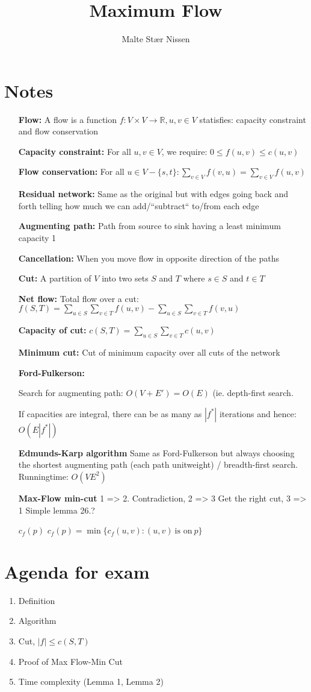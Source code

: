 \documentclass[11pt,a4paper]{article}
\title{Maximum Flow}
\author{Malte Stær Nissen}
\begin{document}
\maketitle

\section{Notes}
\begin{itemize}
    \item[\textbf{Flow:}]{ A flow is a function $f : V \times V \rightarrow \mathbb{R}, u,v \in V$
        statisfies: capacity constraint and flow conservation}
    \item[\textbf{Capacity constraint:}]{
        For all $u,v \in V$, we require: $0 \leq f(u,v) \leq c(u,v)$}
    \item[\textbf{Flow conservation:}]{
        For all $u \in V - \{s, t\}: \sum_{v \in V} f(v,u) = \sum_{v \in V} f(u,v)$}
    \item[\textbf{Residual network:}]{Same as the original but with edges going back and forth telling how much we can add/``subtract`` to/from each edge}
    \item[\textbf{Augmenting path:}]{Path from source to sink having a least minimum capacity 1}
    \item[\textbf{Cancellation:}]{When you move flow in opposite direction of the paths}
    \item[\textbf{Cut:}]{A partition of $V$ into two sets $S$ and $T$ where $s \in S$ and $t \in T$}
    \item[\textbf{Net flow:}]{Total flow over a cut: $f(S,T) = \sum_{u \in S} \sum_{v \in T}  f(u,v) - \sum_{u \in S} \sum_{v \in T} f(v,u)$}
    \item[\textbf{Capacity of cut:}]{$c(S,T) = \sum_{u \in S} \sum_{v \in T} c(u,v)$}
    \item[\textbf{Minimum cut:}]{Cut of minimum capacity over all cuts of the network}
    \item[\textbf{Ford-Fulkerson:}]{Search for augmenting path: $O(V+E') = O(E)$ (ie. depth-first search.

        If capacities are integral, there can be as many as $|f^\ast|$ iterations and hence: $O(E |f^\ast|)$}
    \item[\textbf{Edmunds-Karp algorithm}]{Same as Ford-Fulkerson but always choosing the shortest augmenting path (each path unitweight) / breadth-first search. Runningtime: $O(VE^2)$}
    \item[\textbf{Max-Flow min-cut}]{1 => 2. Contradiction, 2 => 3 Get the right cut, 3 => 1 Simple lemma 26.?}
    \item[\textbf{$c_f(p)$}]{$c_f(p) = \min \{ c_f(u,v) : (u,v) ~\text{is on}~p \}$}
\end{itemize}

\section{Agenda for exam}
\begin{enumerate}
    \item Definition
    \item Algorithm
    \item Cut, $|f| \leq c(S,T)$
    \item Proof of Max Flow-Min Cut
    \item Time complexity (Lemma 1, Lemma 2)
\end{enumerate}
\end{document}
